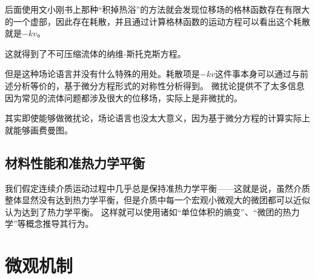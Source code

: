 后面使用文小刚书上那种“积掉热浴”的方法就会发现位移场的格林函数存在有限大的一个虚部，因此存在耗散，并且通过计算格林函数的运动方程可以看出这个耗散就是$-k v$。

这就得到了不可压缩流体的纳维-斯托克斯方程。

但是这种场论语言并没有什么特殊的用处。耗散项是$-kv$这件事本身可以通过与前述分析等价的，基于微分方程形式的对称性分析得到。
微扰论提供不了太多信息因为常见的流体问题都涉及很大的位移场，实际上是非微扰的。

其实即使能够做微扰论，场论语言也没太大意义，因为基于微分方程的计算实际上就能够画费曼图。

\section{材料性能和准热力学平衡}

我们假定连续介质运动过程中几乎总是保持准热力学平衡——这就是说，虽然介质整体显然没有达到热力学平衡，但是介质中每一个宏观小微观大的微团都可以近似认为达到了热力学平衡。
这样就可以使用诸如“单位体积的熵变”、“微团的热力学”等概念推导其行为。

\chapter{微观机制}

